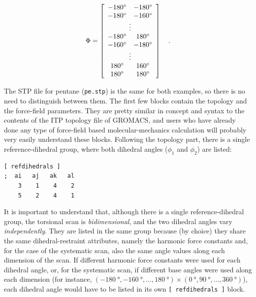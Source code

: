 \documentclass[10pt,a4paper,openany]{memoir}
\numberwithin{equation}{section}
\begin{document}
\begin{align}\label{eq:tutorial-gen-matrix}
  \Phi = \left[
  \begin{array}{cc}
    \SI{-180}{\degree}&\SI{-180}{\degree} \\
    \SI{-180}{\degree}&\SI{-160}{\degree} \\
    \multicolumn{2}{c}{\vdots} \\
    \SI{-180}{\degree}&\SI{+180}{\degree} \\
    \SI{-160}{\degree}&\SI{-180}{\degree} \\
    \multicolumn{2}{c}{\vdots} \\
    \SI{+180}{\degree}&\SI{+160}{\degree} \\
    \SI{+180}{\degree}&\SI{+180}{\degree} \\
  \end{array}
  \right] \quad .
\end{align}

The STP file for pentane (\texttt{pe.stp}) is the same for both examples, so
there is no need to distinguish between them.
%
The first few blocks contain the topology and the force-field
parameters.
%
They are pretty similar in concept and syntax to the contents of the ITP
topology file of GROMACS, and users who have already done any type of
force-field based molecular-mechanics calculation will probably very easily
understand these blocks.
%
Following the topology part, there is a single reference-dihedral group,
where both dihedral angles ($\phi_1$ and $\phi_2$) are listed:

\begin{lstlisting}[language=gromacs]
[ refdihedrals ]
;  ai   aj   ak   al
    3    1    4    2
    5	 2    4	   1
\end{lstlisting}\vspace{2ex}\par

\noindent
It is important to understand that, although there is a single
reference-dihedral group, the torsional scan is \textit{bidimensional}, and the
two dihedral angles vary \textit{independently}.  They are listed in the same
group because (by choice) they share the same dihedral-restraint attributes,
namely the harmonic force constants and, for the case of the systematic scan,
also the same angle values along each dimension of the scan. If different
harmonic force constants were used for each dihedral angle, or, for the
systematic scan, if different base angles were used along each dimension (for
instance,
$(\SI{-180}{\degree},\SI{-160}{\degree},\ldots,\SI{180}{\degree}) \times
(\SI{0}{\degree},\SI{90}{\degree},\ldots,\SI{360}{\degree})$), each dihedral
angle would have to be listed in its own \texttt{[~refdihedrals~]} block.
%
\end{document}
